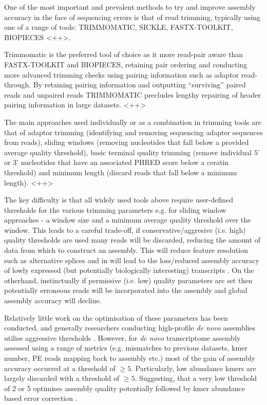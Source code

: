 One of the most important and prevalent methods to try and improve assembly
accuracy in the face of sequencing errors is that of read trimming, typically
using one of a range of tools: TRIMMOMATIC, SICKLE, FASTX-TOOLKIT, BIOPIECES \citep{}<++>. %

Trimmomatic is the preferred tool of choice as it more read-pair aware than
FASTX-TOOLKIT and BIOPIECES, retaining pair ordering and conducting more
advanced trimming checks using pairing information such as adaptor read-through.
By retaining pairing information and outputting ``surviving'' paired reads and
unpaired reads TRIMMOMATIC precludes lengthy repairing of header pairing information
in large datasets. \citep{}<++> %

The main approaches used individually or as a combination in trimming tools are that 
of adaptor trimming (identifying and removing sequencing adapter sequences from reads),
sliding windows (removing nucleotides that fall below a provided average quality threshold),
basic terminal quality trimming (remove individual 5' or 3' nucleotides that have an associated PHRED score
below a ceratin threshold) and minimum length (discard reads that fall below a minimum length). 
\citep{}<++> %

The key difficulty is that all widely used tools above require user-defined thresholds
for the various trimming parameters e.g. for sliding window approaches - a window size
and a minimum average quality threshold over the window.  
This leads to a careful trade-off, if conservative/aggresive (i.e. high) quality thresholds
are used many reads will be discarded, reducing the amount of data from which to 
construct an assembly.  This will reduce feature resolution such as alternative splices 
and in will lead to the loss/reduced assembly accuracy of lowly expressed (but potentially biologically interesting) transcripts \citep{MacManes2014}. On the otherhand, instinctually if permissive (i.e. low)
quality parameters are set then potentially erroneous reads will be incorporated into the assembly
and global assembly accuracy will decline. 

Relatively little work on the optimisation of these parameters has been conducted, and generally
researchers conducting high-profile \textit{de novo} assemblies utilise aggressive thresholds \citep{MacManes2014}.
However, for \textit{de novo} transcriptome assembly assessed using a range of metrics
(e.g. mismatches to previous datasets, kmer number, PE reads mapping back to assembly etc.)
most of the gain of assembly accuracy occurred at a threshold of \(\geq 5\).
Particularly, low abundance kmers are largely discarded with a threshold of \(\geq 5\).
Suggesting, that a very low threshold of 2 or 5 optimises assembly quality potentially
followed by kmer abundance based error correction \citep{MacManes2014}.



